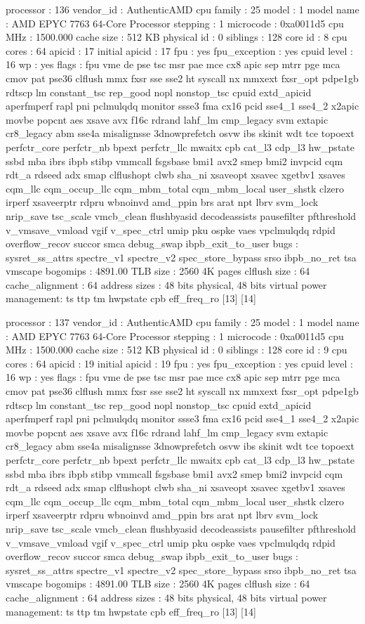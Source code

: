processor	: 136
vendor_id	: AuthenticAMD
cpu family	: 25
model		: 1
model name	: AMD EPYC 7763 64-Core Processor
stepping	: 1
microcode	: 0xa0011d5
cpu MHz		: 1500.000
cache size	: 512 KB
physical id	: 0
siblings	: 128
core id		: 8
cpu cores	: 64
apicid		: 17
initial apicid	: 17
fpu		: yes
fpu_exception	: yes
cpuid level	: 16
wp		: yes
flags		: fpu vme de pse tsc msr pae mce cx8 apic sep mtrr pge mca cmov pat pse36 clflush mmx fxsr sse sse2 ht syscall nx mmxext fxsr_opt pdpe1gb rdtscp lm constant_tsc rep_good nopl nonstop_tsc cpuid extd_apicid aperfmperf rapl pni pclmulqdq monitor ssse3 fma cx16 pcid sse4_1 sse4_2 x2apic movbe popcnt aes xsave avx f16c rdrand lahf_lm cmp_legacy svm extapic cr8_legacy abm sse4a misalignsse 3dnowprefetch osvw ibs skinit wdt tce topoext perfctr_core perfctr_nb bpext perfctr_llc mwaitx cpb cat_l3 cdp_l3 hw_pstate ssbd mba ibrs ibpb stibp vmmcall fsgsbase bmi1 avx2 smep bmi2 invpcid cqm rdt_a rdseed adx smap clflushopt clwb sha_ni xsaveopt xsavec xgetbv1 xsaves cqm_llc cqm_occup_llc cqm_mbm_total cqm_mbm_local user_shstk clzero irperf xsaveerptr rdpru wbnoinvd amd_ppin brs arat npt lbrv svm_lock nrip_save tsc_scale vmcb_clean flushbyasid decodeassists pausefilter pfthreshold v_vmsave_vmload vgif v_spec_ctrl umip pku ospke vaes vpclmulqdq rdpid overflow_recov succor smca debug_swap ibpb_exit_to_user
bugs		: sysret_ss_attrs spectre_v1 spectre_v2 spec_store_bypass srso ibpb_no_ret tsa vmscape
bogomips	: 4891.00
TLB size	: 2560 4K pages
clflush size	: 64
cache_alignment	: 64
address sizes	: 48 bits physical, 48 bits virtual
power management: ts ttp tm hwpstate cpb eff_freq_ro [13] [14]

processor	: 137
vendor_id	: AuthenticAMD
cpu family	: 25
model		: 1
model name	: AMD EPYC 7763 64-Core Processor
stepping	: 1
microcode	: 0xa0011d5
cpu MHz		: 1500.000
cache size	: 512 KB
physical id	: 0
siblings	: 128
core id		: 9
cpu cores	: 64
apicid		: 19
initial apicid	: 19
fpu		: yes
fpu_exception	: yes
cpuid level	: 16
wp		: yes
flags		: fpu vme de pse tsc msr pae mce cx8 apic sep mtrr pge mca cmov pat pse36 clflush mmx fxsr sse sse2 ht syscall nx mmxext fxsr_opt pdpe1gb rdtscp lm constant_tsc rep_good nopl nonstop_tsc cpuid extd_apicid aperfmperf rapl pni pclmulqdq monitor ssse3 fma cx16 pcid sse4_1 sse4_2 x2apic movbe popcnt aes xsave avx f16c rdrand lahf_lm cmp_legacy svm extapic cr8_legacy abm sse4a misalignsse 3dnowprefetch osvw ibs skinit wdt tce topoext perfctr_core perfctr_nb bpext perfctr_llc mwaitx cpb cat_l3 cdp_l3 hw_pstate ssbd mba ibrs ibpb stibp vmmcall fsgsbase bmi1 avx2 smep bmi2 invpcid cqm rdt_a rdseed adx smap clflushopt clwb sha_ni xsaveopt xsavec xgetbv1 xsaves cqm_llc cqm_occup_llc cqm_mbm_total cqm_mbm_local user_shstk clzero irperf xsaveerptr rdpru wbnoinvd amd_ppin brs arat npt lbrv svm_lock nrip_save tsc_scale vmcb_clean flushbyasid decodeassists pausefilter pfthreshold v_vmsave_vmload vgif v_spec_ctrl umip pku ospke vaes vpclmulqdq rdpid overflow_recov succor smca debug_swap ibpb_exit_to_user
bugs		: sysret_ss_attrs spectre_v1 spectre_v2 spec_store_bypass srso ibpb_no_ret tsa vmscape
bogomips	: 4891.00
TLB size	: 2560 4K pages
clflush size	: 64
cache_alignment	: 64
address sizes	: 48 bits physical, 48 bits virtual
power management: ts ttp tm hwpstate cpb eff_freq_ro [13] [14]

